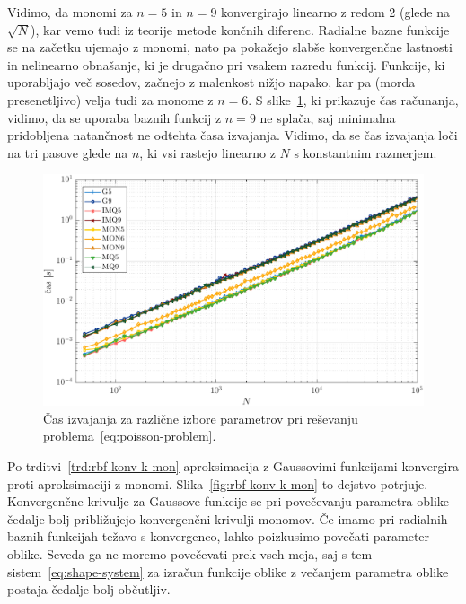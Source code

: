 \documentclass[12pt,a4paper,twoside]{article}
\theoremstyle{definition} %
\theoremstyle{plain} %
\numberwithin{equation}{section}
\newlength{\iw}
\begin{document}
Vidimo, da monomi za $n=5$ in $n=9$ konvergirajo linearno z redom 2 (glede na $\sqrt{N}$), kar vemo
tudi iz teorije metode končnih diferenc. Radialne bazne funkcije se na začetku ujemajo z monomi,
nato pa pokažejo slabše konvergenčne lastnosti in nelinearno obnašanje, ki je drugačno pri vsakem razredu
funkcij. Funkcije, ki uporabljajo več sosedov, začnejo z malenkost nižjo napako, kar pa (morda
presenetljivo) velja tudi za monome z $n=6$. S slike~\ref{fig:poisson-square-time}, ki prikazuje čas
računanja, vidimo, da se uporaba baznih funkcij z $n = 9$ ne splača, saj minimalna pridobljena
natančnost ne odtehta časa izvajanja. Vidimo, da se čas izvajanja loči na tri pasove glede na $n$,
ki vsi rastejo linearno z $N$ s konstantnim razmerjem.

\begin{figure}[h]
  \centering
  \includegraphics[width=\iw]{images/poisson_square_time.pdf}
  \caption[Čas izvajanja MLSM pri reševanju Poissonove enačbe]{Čas izvajanja za
  različne izbore parametrov pri reševanju
problema~\eqref{eq:poisson-problem}.}
  \label{fig:poisson-square-time}
\end{figure}

Po trditvi~\ref{trd:rbf-konv-k-mon} aproksimacija z Gaussovimi funkcijami konvergira proti
aproksimaciji z monomi. Slika~\ref{fig:rbf-konv-k-mon} to dejstvo potrjuje. Konvergenčne krivulje za
Gaussove funkcije se pri povečevanju parametra oblike čedalje bolj približujejo konvergenčni
krivulji monomov. Če imamo pri radialnih baznih funkcijah težavo s konvergenco, lahko poizkusimo
povečati parameter oblike. Seveda ga ne moremo povečevati prek vseh meja, saj s tem
sistem~\eqref{eq:shape-system} za izračun funkcije oblike z večanjem parametra oblike postaja
čedalje bolj občutljiv.
\end{document}
